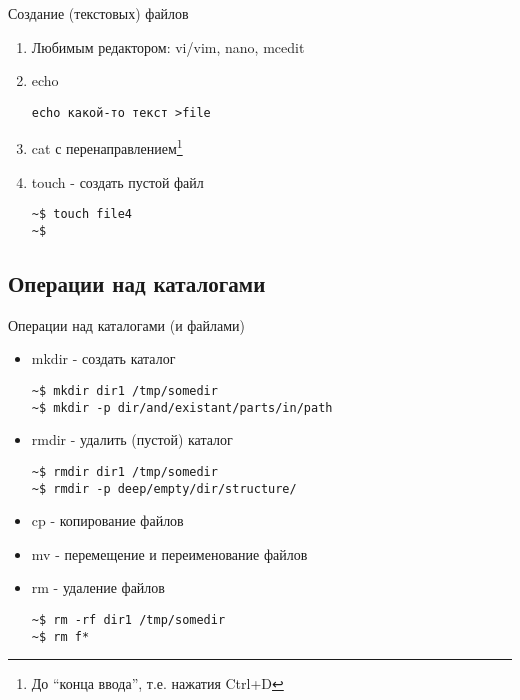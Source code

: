 \begin{frame}[fragile]{Создание (текстовых) файлов}
  \pause
  \begin{enumerate}
    \item Любимым редактором: \alert{vi/vim}, \alert{nano}, \alert{mcedit} \pause
    \item \alert{echo}
\begin{lstlisting}[frame=single]
echo какой-то текст >file
\end{lstlisting}\pause
    \item \alert{cat} с перенаправлением\footnote{До ``конца ввода'', т.е. нажатия Ctrl+D}
 \pause
    \item \alert{touch} - создать пустой файл
\begin{lstlisting}[frame=single]
~$ touch file4
~$
\end{lstlisting}
  \end{enumerate}
\end{frame}

\subsection{Операции над каталогами}

\begin{frame}[fragile]{Операции над каталогами (и файлами)}
  \begin{itemize}
    \item \alert{mkdir} - создать каталог
\begin{lstlisting}[frame=single,]
~$ mkdir dir1 /tmp/somedir
~$ mkdir -p dir/and/existant/parts/in/path
\end{lstlisting} \pause
    \item \alert{rmdir} - удалить (пустой) каталог
\begin{lstlisting}[frame=single]
~$ rmdir dir1 /tmp/somedir
~$ rmdir -p deep/empty/dir/structure/
\end{lstlisting} \pause
    \item \alert{cp} - копирование файлов\footnotemark[8]
    \item \alert{mv} - перемещение и переименование файлов
    \item \alert{rm} - удаление файлов\footnotemark[17] 
\begin{lstlisting}[frame=single]
~$ rm -rf dir1 /tmp/somedir
~$ rm f*
\end{lstlisting} \pause
  \end{itemize}
\end{frame}



